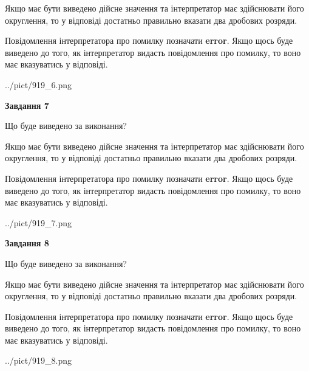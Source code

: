 \documentclass[12pt, ukrainian]{article}
\begin{document}
{\begin {Large}
Якщо має бути виведено дійсне значення та інтерпретатор має здійснювати його округлення, 
то у відповіді достатньо правильно вказати два дробових розряди.

Повідомлення інтерпретатора про помилку позначати \textbf{error}.
Якщо щось буде виведено до того, як інтерпретатор видасть повідомлення про помилку, 
то воно має вказуватись у відповіді. \par

\begin{center}
	{../pict/919_6.png}
\end{center}
\newpage

{\begin {center}\textbf{Завдання 7}\end {center}}\par
Що буде виведено за виконання? \par

Якщо має бути виведено дійсне значення та інтерпретатор має здійснювати його округлення, 
то у відповіді достатньо правильно вказати два дробових розряди.

Повідомлення інтерпретатора про помилку позначати \textbf{error}.
Якщо щось буде виведено до того, як інтерпретатор видасть повідомлення про помилку, 
то воно має вказуватись у відповіді. \par

\begin{center}
	{../pict/919_7.png}
\end{center}
\newpage

{\begin {center}\textbf{Завдання 8}\end {center}}\par
Що буде виведено за виконання? \par

Якщо має бути виведено дійсне значення та інтерпретатор має здійснювати його округлення, 
то у відповіді достатньо правильно вказати два дробових розряди.

Повідомлення інтерпретатора про помилку позначати \textbf{error}.
Якщо щось буде виведено до того, як інтерпретатор видасть повідомлення про помилку, 
то воно має вказуватись у відповіді. \par

\begin{center}
	{../pict/919_8.png}
\end{center}
\newpage


\end{Large}}
\end{document}
